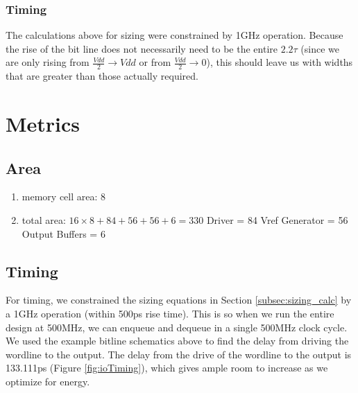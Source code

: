 \documentclass[a4paper]{article}
\begin{document}
\subsubsection{Timing}
\label{subsec:time_calc}
The calculations above for sizing were constrained by 1GHz operation. Because the rise of the bit line does not necessarily need to be the entire $2.2\tau$ (since we are only rising from $\frac{Vdd}{2} \rightarrow Vdd$ or from $\frac{Vdd}{2} \rightarrow 0$), this should leave us with widths that are greater than those actually required.



\section{Metrics}
\label{sec:metrics}

\subsection{Area}
\begin{enumerate}
\item memory cell area: 8
\item total area: $16 \times 8 + 84 + 56 + 56 + 6 = 330$
\subitem Driver = 84
\subitem Vref Generator = 56
\subitem Output Buffers = 6
\end{enumerate}

\subsection{Timing}
For timing, we constrained the sizing equations in Section \ref{subsec:sizing_calc} by a 1GHz operation (within 500ps rise time). This is so when we run the entire design at 500MHz, we can enqueue and dequeue in a single 500MHz clock cycle. We used the example bitline schematics above to find the delay from driving the wordline to the output. The delay from the drive of the wordline to the output is 133.111ps (Figure \ref{fig:ioTiming}), which gives ample room to increase as we optimize for energy.
\end{document}
